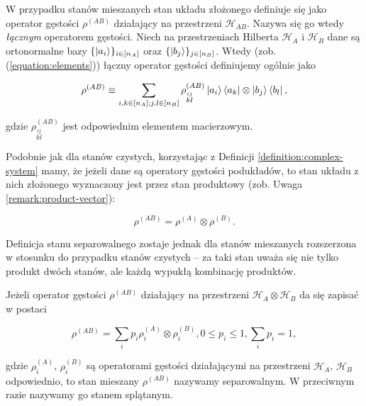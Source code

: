 W przypadku stanów mieszanych stan układu złożonego definiuje się jako operator gęstości $\rho ^ {(AB)}$ działający na przestrzeni $\mathcal{H}_{AB}$. Nazywa się go wtedy \textit{łącznym} operatorem gęstości. Niech na przestrzeniach Hilberta $\mathcal{H}_{A}$ i $\mathcal{H}_{B}$ dane są ortonormalne bazy $\{\ket{a_{i}}\}_{i \in [n_{A}]}$ oraz $\{\ket{b_{j}}\}_{j \in [n_{B}]}$. Wtedy (zob. (\ref{equation:elements})) łączny operator gęstości definiujemy ogólnie jako

\begin{equation}
    \label{equation:complexmixed}
    \rho ^ {(AB)} \equiv \sum\limits_{i, k \in [n_{A}]; j, l \in [n_{B}]} \rho_{\stackrel{ij}{kl}} ^ {(AB)} \ket{a_{i}} \bra{a_{k}} \otimes \ket{b_{j}} \bra{b_{l}},
\end{equation}

gdzie $\rho_{\stackrel{ij}{kl}} ^ {(AB)}$ jest odpowiednim elementem macierzowym.

Podobnie jak dla stanów czystych, korzystając z Definicji \ref{definition:complex-system} mamy, że jeżeli dane są operatory gęstości podukładów, to stan układu z nich złożonego wyznaczony jest przez stan produktowy (zob. Uwaga \ref{remark:product-vector}):

\begin{equation}
    \label{equation:mixedproduct}
    \rho ^ {(AB)} = \rho ^ {(A)} \otimes \rho ^ {(B)}.
\end{equation}

Definicja stanu separowalnego zostaje jednak dla stanów mieszanych rozszerzona w stosunku do przypadku stanów czystych -- za taki stan uważa się nie tylko produkt dwóch stanów, ale każdą wypukłą kombinację produktów.

\begin{definition}
    Jeżeli operator gęstości $\rho ^ {(AB)}$ działający na przestrzeni $\mathcal{H}_A \otimes \mathcal{H}_B$ da się zapisać w postaci 

    \begin{equation}
        \label{equation:separable}
        \rho ^ {(AB)} = \sum\limits_{i} p_{i} \rho_{i} ^ {(A)} \otimes \rho_{i} ^ {(B)}, 0 \leq p_i \leq 1, \sum\limits_{i} p_i = 1,
    \end{equation}

    gdzie $\rho_{i} ^ {(A)}$, $\rho_{i} ^ {(B)}$ są operatorami gęstości działającymi na przestrzeni $\mathcal{H}_A$, $\mathcal{H}_B$ odpowiednio, to stan mieszany $\rho^{(AB)}$ nazywamy separowalnym. W przeciwnym razie nazywamy go stanem splątanym.
\end{definition}


